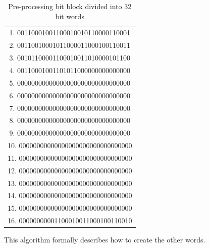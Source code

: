         \begin{table}[h!]
            \caption{Pre-processing bit block divided into 32 bit words}
            \centering
            \label{tab:Pre-processing bit block divided into 32 bit words}
            
            \begin{tabular}{|c|}
            \hline \rule{0pt}{4ex} 

            
              1. 00110001001100010010110000110001 \\
             
              2. 00110010001011000011000100110011 \\
             
              3. 00101100001100010011010000101100 \\
             
              4. 00110001001101011000000000000000 \\
             
              5. 00000000000000000000000000000000 \\
             
              6. 00000000000000000000000000000000 \\
             
              7. 00000000000000000000000000000000 \\
             
              8. 00000000000000000000000000000000 \\
             
              9. 00000000000000000000000000000000 \\
             
              10. 00000000000000000000000000000000 \\
             
              11. 00000000000000000000000000000000 \\
             
              12. 00000000000000000000000000000000 \\
             
              13. 00000000000000000000000000000000 \\
             
              14. 00000000000000000000000000000000 \\
             
              15. 00000000000000000000000000000000 \\
             
              16. 00000000001100010011000100110010 \\
             
            \hline
            \end{tabular}
        \end{table}
        This algorithm formally describes how to create the other words. 
        
